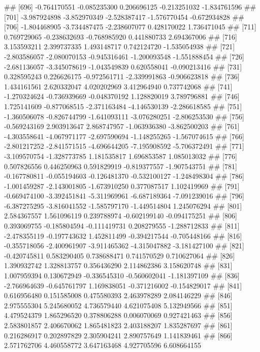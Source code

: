 \documentclass[
]{article}
\begin{document}
\begin{enumerate}[label=(\alph*)]
##  [696] -0.764170551 -0.085235300  0.206696125 -0.213251032 -1.834761596
##  [701] -3.987924898 -3.852970349 -2.528387417 -1.576770454 -0.672934828
##  [706] -1.804468905 -3.734487475 -2.238607077  0.428170022  1.736471045
##  [711]  0.769729065 -0.238632693 -0.768985920  0.441880733  2.694367006
##  [716]  3.153593211  2.399737335  1.493148717  0.742124720 -1.535054938
##  [721] -2.803586057 -2.080070153 -0.945316461 -1.200093548 -1.551888454
##  [726] -2.681136057 -3.345078619 -1.043549839  0.620558041 -0.090213416
##  [731]  0.328595243  0.226626175 -0.972561711 -2.339991863 -0.906623818
##  [736]  1.434161561  2.620332047  4.020202969  3.412964940  0.737742068
##  [741] -1.270324624 -0.736939669 -0.048370192  1.128820019  3.789796881
##  [746]  1.725141609 -0.877068515 -2.371163484 -4.146530139 -2.286618585
##  [751] -1.360506078 -0.826744799 -1.641093111 -3.076280251 -2.806253530
##  [756] -0.569243169  2.903913647  2.868747957 -1.063936380 -3.862500203
##  [761] -4.303558641 -4.067971177 -2.697590694 -1.148255265 -1.567074615
##  [766] -2.801217252 -2.841571515 -4.696644205 -7.195908592 -5.706372491
##  [771] -3.109570754 -1.328773785  1.181535817  1.696853587  1.085013032
##  [776]  0.507826556  0.446250963  0.591829919 -0.819377557 -1.907543751
##  [781] -0.167780811 -0.055194603 -0.126481370 -0.532100127 -1.248498304
##  [786] -1.001459287 -2.143001805 -1.673910250  0.377087517  1.102419969
##  [791] -0.669474100 -3.392451841 -5.311969961 -6.687189364 -7.091239016
##  [796] -6.387275295 -3.816041552 -1.585797170 -1.449514804  1.245076294
##  [801]  2.584367557  1.561096119  0.239788974 -0.602199140 -0.094175251
##  [806]  0.393069755 -0.185804594 -0.111419731  0.208279555 -1.288712833
##  [811] -2.478355119 -0.197743632  1.452811499 -0.394217544 -0.705448166
##  [816] -0.355718056 -2.400961907 -3.911465362 -4.315047882 -3.181427100
##  [821] -0.420745811  0.583290405  0.738688471  0.741570529  0.710627064
##  [826]  1.390932742  1.328813757  0.356436290  2.114862386  3.158620748
##  [831]  1.007959394  0.130672949 -0.336545310 -0.560602041 -1.181397109
##  [836] -2.766964639 -0.645761797  1.169838051 -0.371216002 -0.154829017
##  [841]  0.616956480  0.151585008  0.475580393  2.463978289  2.084146229
##  [846]  2.975555304  5.245680052  4.736579440  4.621075408  5.132949566
##  [851]  4.479524379  1.865296520  0.378806288  0.006070069  0.927421463
##  [856]  2.583801857  2.406670062  1.865481823  2.403188207  1.835287697
##  [861]  0.216286917  0.202897829  2.305904241  2.890757649  1.141839461
##  [866]  2.571762706  4.460558772  3.647163468  4.927705596  6.608664155

\end{enumerate}
\end{document}
